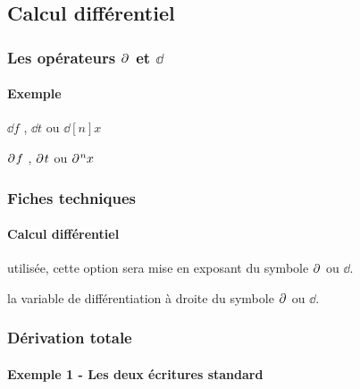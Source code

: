 \documentclass[12pt,a4paper]{article}
\begin{document}

\subsection{Calcul différentiel}

\subsubsection{\texorpdfstring{Les opérateurs $\pp{}$ et $\dd{}$}%
                               {Les opérateurs "d rond" et "d droit"}}

\paragraph{Exemple}

\begin{latexex}
$\dd{f}$ , $\dd{t}$ ou $\dd[n]{x}$

$\pp{f}$ , $\pp{t}$ ou $\pp[n]{x}$
\end{latexex}




\subsubsection{Fiches techniques}

\paragraph{Calcul différentiel}



\IDoption{} utilisée, cette option sera mise en exposant du symbole $\pp{}$ ou $\dd{}$.

\IDarg{} la variable de différentiation à droite du symbole $\pp{}$ ou $\dd{}$.




\subsubsection{Dérivation totale}

\paragraph{Exemple 1 - Les deux écritures standard}
\end{document}

